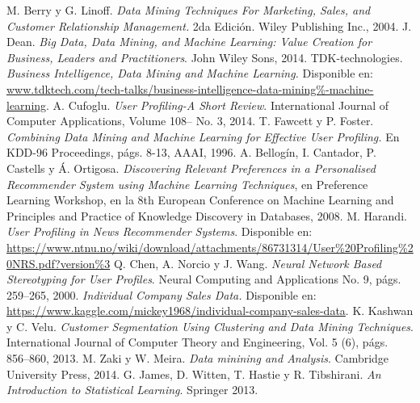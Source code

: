 \documentclass[letterpaper,11pt]{article}
\begin{document}
\begin{multicols}{2}
\begin{thebibliography}{10}
        {\small 
     M. Berry y G. Linoff. {\em Data Mining Techniques For Marketing, Sales, and Customer Relationship Management.} 
        2da Edición. Wiley Publishing Inc., 2004. 
     J. Dean. {\em Big Data, Data Mining, and Machine Learning: Value Creation for Business, Leaders and
        Practitioners}. John Wiley  Sons, 2014.
     TDK-technologies. {\em Business Intelligence, Data Mining and Machine Learning.} 
        Disponible en: \url{www.tdktech.com/tech-talks/business-intelligence-data-mining%-machine-learning}. 
         A. Cufoglu. {\em User Profiling-A Short Review}. International Journal of Computer Applications,
        Volume 108-- No. 3, 2014.
     T. Fawcett y P. Foster. {\em Combining Data Mining and Machine Learning for Effective User
        Profiling.} En KDD-96 Proceedings, págs. 8-13, AAAI, 1996.
     A. Bellogín, I. Cantador, P. Castells y Á. Ortigosa. {\em Discovering Relevant Preferences in a Personalised
        Recommender System using Machine Learning Techniques}, en Preference Learning Workshop, en la 8th
        European Conference on Machine  Learning and Principles and Practice of Knowledge Discovery in Databases, 2008. 
     M. Harandi. {\em User Profiling in News Recommender Systems}. Disponible en:
        \url{https://www.ntnu.no/wiki/download/attachments/86731314/User%20Profiling%20NRS.pdf?version%3}
     Q. Chen, A. Norcio y J. Wang. {\em Neural Network Based Stereotyping for User Profiles}. Neural
        Computing and Applications No. 9, págs. 259--265,  2000.
     {\em Individual Company Sales Data.} Disponible en:
        \url{https://www.kaggle.com/mickey1968/individual-company-sales-data}. 
     K. Kashwan y C. Velu. {\em Customer Segmentation Using Clustering and Data Mining Techniques}. International Journal of Computer Theory 
        and Engineering, Vol. 5 (6), págs. 856--860, 2013. 
     M. Zaki y W. Meira. {\em Data minining and Analysis}. Cambridge University Press, 2014. 
     G. James, D. Witten, T. Hastie y R. Tibshirani. {\em An Introduction to Statistical Learning}.
        Springer 2013.
    }
\end{thebibliography}
\end{multicols}
\end{document}
